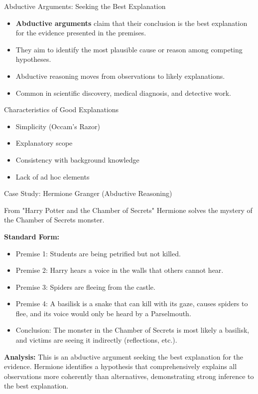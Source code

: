 \documentclass{beamer}
\begin{document}
\begin{frame}{Abductive Arguments: Seeking the Best Explanation}
    \begin{itemize}
        \item \textbf{Abductive arguments} claim that their conclusion is the best explanation for the evidence presented in the premises.
        \item They aim to identify the most plausible cause or reason among competing hypotheses.
        \item Abductive reasoning moves from observations to likely explanations.
        \item Common in scientific discovery, medical diagnosis, and detective work.
    \end{itemize}
    
    \begin{block}{Characteristics of Good Explanations}
        \begin{itemize}
            \item Simplicity (Occam's Razor)
            \item Explanatory scope
            \item Consistency with background knowledge
            \item Lack of ad hoc elements
        \end{itemize}
    \end{block}
\end{frame}


\begin{frame}{Case Study: Hermione Granger (Abductive Reasoning)}
    \begin{block}{From "Harry Potter and the Chamber of Secrets"}
        Hermione solves the mystery of the Chamber of Secrets monster.
    \end{block}
    
    \textbf{Standard Form:}
    \small
    \begin{itemize}
        \item Premise 1: Students are being petrified but not killed.
        \item Premise 2: Harry hears a voice in the walls that others cannot hear.
        \item Premise 3: Spiders are fleeing from the castle.
        \item Premise 4: A basilisk is a snake that can kill with its gaze, causes spiders to flee, and its voice would only be heard by a Parselmouth.
        \item Conclusion: The monster in the Chamber of Secrets is most likely a basilisk, and victims are seeing it indirectly (reflections, etc.).
    \end{itemize}
    
    \textbf{Analysis:} This is an abductive argument seeking the best explanation for the evidence. Hermione identifies a hypothesis that comprehensively explains all observations more coherently than alternatives, demonstrating strong inference to the best explanation.
\end{frame}
\end{document}
